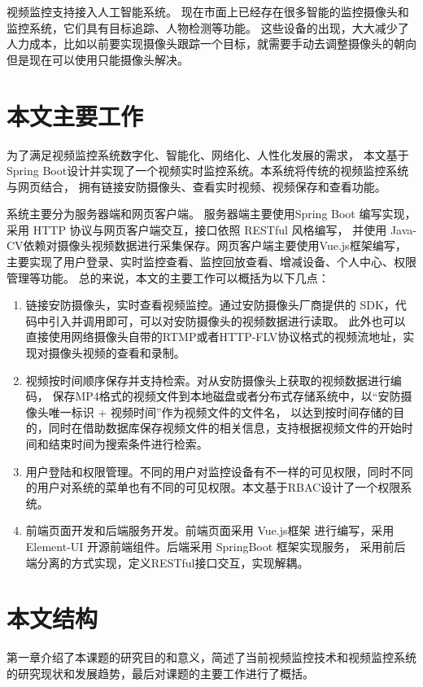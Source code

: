 视频监控支持接入人工智能系统。
现在市面上已经存在很多智能的监控摄像头和监控系统，它们具有目标追踪、人物检测等功能。
这些设备的出现，大大减少了人力成本，比如以前要实现摄像头跟踪一个目标，就需要手动去调整摄像头的朝向
但是现在可以使用只能摄像头解决。

\section{本文主要工作}
为了满足视频监控系统数字化、智能化、网络化、人性化发展的需求，
本文基于Spring Boot设计并实现了一个视频实时监控系统。本系统将传统的视频监控系统与网页结合，
拥有链接安防摄像头、查看实时视频、视频保存和查看功能。

系统主要分为服务器端和网页客户端。
服务器端主要使用Spring Boot 编写实现，采用 HTTP 协议与网页客户端交互，接口依照 RESTful 风格编写，
并使用 Java-CV依赖对摄像头视频数据进行采集保存。网页客户端主要使用Vue.js框架编写，主要实现了用户登录、实时监控查看、监控回放查看、增减设备、个人中心、权限管理等功能。
总的来说，本文的主要工作可以概括为以下几点：
\begin{enumerate}
    \item 链接安防摄像头，实时查看视频监控。通过安防摄像头厂商提供的 SDK，代码中引入并调用即可，可以对安防摄像头的视频数据进行读取。
    此外也可以直接使用网络摄像头自带的RTMP或者HTTP-FLV协议格式的视频流地址，实现对摄像头视频的查看和录制。
    \item 视频按时间顺序保存并支持检索。对从安防摄像头上获取的视频数据进行编码，
    保存MP4格式的视频文件到本地磁盘或者分布式存储系统中，以“安防摄像头唯一标识 + 视频时间”作为视频文件的文件名，
    以达到按时间存储的目的，同时在借助数据库保存视频文件的相关信息，支持根据视频文件的开始时间和结束时间为搜索条件进行检索。
    \item 用户登陆和权限管理。不同的用户对监控设备有不一样的可见权限，同时不同的用户对系统的菜单也有不同的可见权限。本文基于RBAC设计了一个权限系统。
    \item 前端页面开发和后端服务开发。前端页面采用 Vue.js框架 进行编写，采用 Element-UI 开源前端组件。后端采用  SpringBoot 框架实现服务，
    采用前后端分离的方式实现，定义RESTful接口交互，实现解耦。
\end{enumerate}


\section{本文结构}
第一章介绍了本课题的研究目的和意义，简述了当前视频监控技术和视频监控系统的研究现状和发展趋势，最后对课题的主要工作进行了概括。

